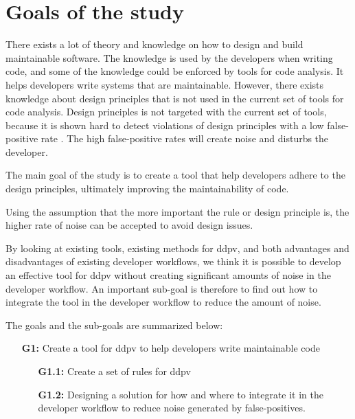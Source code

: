 \documentclass{report}
\begin{document}
\section{Goals of the study}

There exists a lot of theory and knowledge on how to design and build maintainable software. The knowledge is used by the developers when writing code, and some of the knowledge could be enforced by tools for code analysis. It helps developers write systems that are maintainable. However, there exists knowledge about design principles that is not used in the current set of tools for code analysis. Design principles is not targeted with the current set of tools, because it is shown hard to detect violations of design principles with a low false-positive rate . The high false-positive rates will create noise and disturbs the developer. 




The main goal of the study is to create a tool that help developers adhere to the design principles, ultimately improving the maintainability of code. 

Using the assumption that the more important the rule or design principle is, the higher rate of noise can be accepted to avoid design issues. 

By looking at existing tools, existing methods for \gls{ddpv}, and both advantages and disadvantages of existing developer workflows, we think it is possible to develop an effective tool for \gls{ddpv} without creating significant amounts of noise in the developer workflow. An important sub-goal is therefore to find out how to integrate the tool in the developer workflow to reduce the amount of noise. 

The goals and the sub-goals are summarized below:

\begin{enumerate}
    \item [\textbf{G1:}] Create a tool for \gls{ddpv} to help developers write maintainable code
    \begin{enumerate}
        \item [\textbf{G1.1:}] Create a set of rules for \gls{ddpv}
        \item [\textbf{G1.2:}]Designing a solution for how and where to integrate it in the developer workflow to reduce noise generated by false-positives.
    \end{enumerate}
\end{enumerate}
\end{document}
